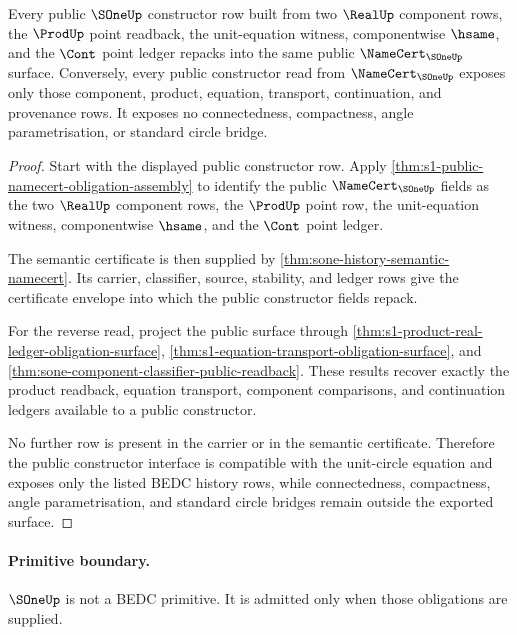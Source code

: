 \begin{theorem}
\label{thm:s1-public-constructor-compatibility}
Every public $\SOneUp$ constructor row built from two $\RealUp$ component
rows, the $\ProdUp$ point readback, the unit-equation witness, componentwise
$\hsame$, and the $\Cont$ point ledger repacks into the same public
$\NameCert_{\SOneUp}$ surface. Conversely, every public constructor read from
$\NameCert_{\SOneUp}$ exposes only those component, product, equation,
transport, continuation, and provenance rows. It exposes no connectedness,
compactness, angle parametrisation, or standard circle bridge.
\end{theorem}
\begin{proof}
Start with the displayed public constructor row. Apply
\autoref{thm:s1-public-namecert-obligation-assembly} to identify the public
$\NameCert_{\SOneUp}$ fields as the two $\RealUp$ component rows, the $\ProdUp$
point row, the unit-equation witness, componentwise $\hsame$, and the $\Cont$
point ledger.

The semantic certificate is then supplied by
\autoref{thm:sone-history-semantic-namecert}. Its carrier, classifier, source,
stability, and ledger rows give the certificate envelope into which the public
constructor fields repack.

For the reverse read, project the public surface through
\autoref{thm:s1-product-real-ledger-obligation-surface},
\autoref{thm:s1-equation-transport-obligation-surface}, and
\autoref{thm:sone-component-classifier-public-readback}. These results recover
exactly the product readback, equation transport, component comparisons, and
continuation ledgers available to a public constructor.

No further row is present in the carrier or in the semantic certificate.
Therefore the public constructor interface is compatible with the unit-circle
equation and exposes only the listed BEDC history rows, while connectedness,
compactness, angle parametrisation, and standard circle bridges remain outside
the exported surface.
\end{proof}

\paragraph{Primitive boundary.}
$\SOneUp$ is not a BEDC primitive. It is admitted only when those obligations are supplied.


